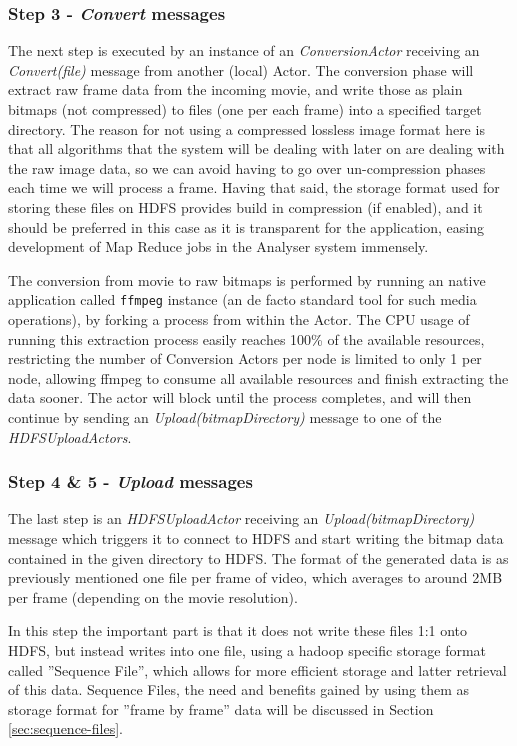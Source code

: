 \subsubsection{Step 3 - \textit{Convert} messages}
The next step is executed by an instance of an \textit{ConversionActor} receiving an \textit{Convert(file)} message from another (local) Actor. The conversion phase will extract raw frame data from the incoming movie, and write those as plain bitmaps (not compressed) to files (one per each frame) into a specified target directory. The reason for not using a compressed lossless image format here is that all algorithms that the system will be dealing with later on are dealing with the raw image data, so we can avoid having to go over un-compression phases each time we will process a frame. Having that said, the storage format used for storing these files on HDFS provides build in compression (if enabled), and it should be preferred in this case as it is transparent for the application, easing development of Map Reduce jobs in the Analyser system immensely.

The conversion from movie to raw bitmaps is performed by running an native application called \verb|ffmpeg| \cite{ffmpeg} instance (an de facto standard tool for such media operations), by forking a process from within the Actor. The CPU usage of running this extraction process easily reaches 100\% of the available resources, restricting the number of Conversion Actors per node is limited to only 1 per node, allowing ffmpeg to consume all available resources and finish extracting the data sooner. The actor will block until the process completes, and will then continue by sending an \textit{Upload(bitmapDirectory)} message to one of the \textit{HDFSUploadActors}.

\subsubsection{Step 4 \& 5 - \textit{Upload} messages}
The last step is an \textit{HDFSUploadActor} receiving an \textit{Upload(bitmapDirectory)} message which triggers it to connect to HDFS and start writing the bitmap data contained in the given directory to HDFS. The format of the generated data is as previously mentioned one file per frame of video, which averages to around 2MB per frame (depending on the movie resolution).

In this step the important part is that it does not write these files 1:1 onto HDFS, but instead writes into one file, using a hadoop specific storage format called ''Sequence File'', which allows for more efficient storage and latter retrieval of this data. Sequence Files, the need and benefits gained by using them as storage format for ''frame by frame'' data will be discussed in Section \ref{sec:sequence-files}.


